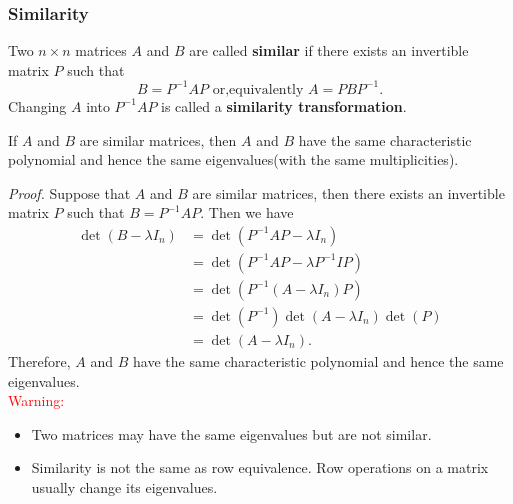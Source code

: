 \documentclass[10pt, a4paper]{article}
\begin{document}
\subsubsection*{Similarity}
\begin{definition}
    Two $n \times n$ matrices $A$ and $B$ are called \textbf{similar} if there exists an invertible matrix $P$ such that \[
    B=P^{-1}AP\text{ or,equivalently }A=PBP^{-1}.
    \]
    Changing $A$ into $P^{-1}AP$ is called a \textbf{similarity transformation}.
\end{definition}
\begin{proposition}
    If $A$ and $B$ are similar matrices, then $A$ and $B$ have the same characteristic polynomial and hence the same eigenvalues(with the same multiplicities).
\end{proposition}
\indent \textit{Proof.} Suppose that $A$ and $B$ are similar matrices, then there exists an invertible matrix $P$ such that $B=P^{-1}AP$. 
Then we have \begin{align*}
    \det(B-\lambda I_n) &= \det(P^{-1}AP-\lambda I_n)\\
    &= \det(P^{-1}AP-\lambda P^{-1}IP)\\
    &= \det(P^{-1}(A-\lambda I_n)P)\\
    &= \det(P^{-1})\det(A-\lambda I_n)\det(P)\\
    &= \det(A-\lambda I_n).
\end{align*}
Therefore, $A$ and $B$ have the same characteristic polynomial and hence the same eigenvalues.\\
\indent \textcolor{red}{Warning:} \begin{itemize}
    \item Two matrices may have the same eigenvalues but are not similar.
    \item Similarity is not the same as row equivalence. Row operations on a matrix usually change its eigenvalues.
\end{itemize}
\end{document}
